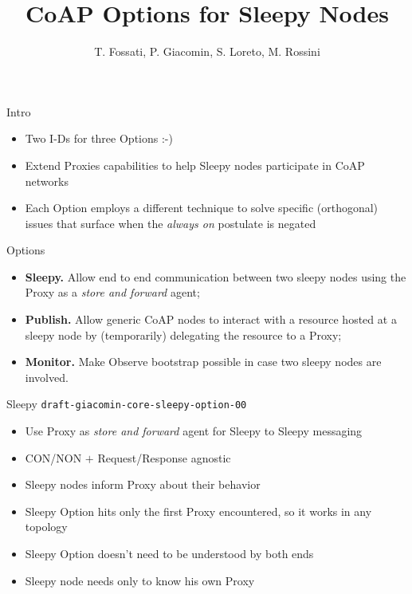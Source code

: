 \documentclass{beamer}
\author{{\scriptsize T. Fossati, P. Giacomin, S. Loreto, M. Rossini}}
\title{CoAP Options for Sleepy Nodes}
\institute{{\large IETF 83, Paris}}
\date{}
\begin{document}
\begin{frame}[plain]
 \titlepage
\end{frame}

\begin{frame}{Intro}

\begin{itemize}
 \item Two I-Ds for three Options :-)
 \item Extend Proxies capabilities to help Sleepy nodes participate in CoAP networks
 \item Each Option employs a different technique to solve specific (orthogonal) issues that surface when the \emph{always on} postulate is negated
\end{itemize}

\end{frame}

\begin{frame}{Options}

\begin{itemize}
 \item \textbf{Sleepy.}  Allow end to end communication between two sleepy nodes using the Proxy as a \emph{store and forward} agent;
 \vspace{.3cm}
 \item \textbf{Publish.}  Allow generic CoAP nodes to interact with a resource hosted at a sleepy node by (temporarily) delegating the resource to a Proxy;
 \vspace{.3cm}
 \item \textbf{Monitor.}  Make Observe bootstrap possible in case two sleepy nodes are involved.
\end{itemize}

\end{frame}


\begin{frame}{Sleepy  \hspace{6cm} {\tiny \texttt{draft-giacomin-core-sleepy-option-00}}}

\begin{itemize}
 \item Use Proxy as \emph{store and forward} agent for Sleepy to Sleepy messaging
 \item CON/NON $+$ Request/Response agnostic
 \item Sleepy nodes inform Proxy about their behavior
 \item Sleepy Option hits only the first Proxy encountered, so it works in any topology
 \item Sleepy Option doesn't need to be understood by both ends
 \item Sleepy node needs only to know his own Proxy
\end{itemize}

\end{frame}
\end{document}
